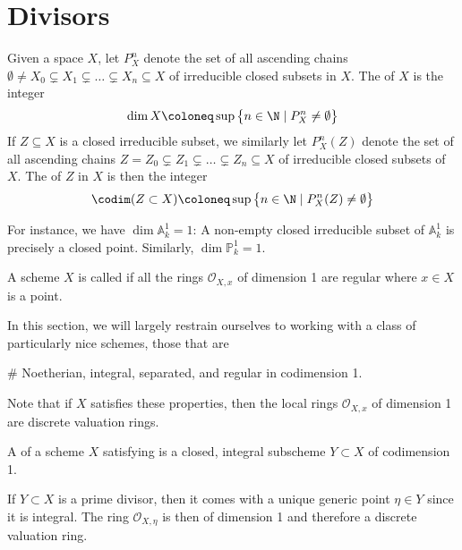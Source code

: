 \documentclass[wip, algebra]{bsteffan-lecturenotes}
\newcommand{\cO}{\mathcal{O}}
\newcommand{\A}{\mathbb{A}}
\renewcommand{\P}{\mathbb{P}}
\begin{document}
\section{Divisors}
\begin{definition}
	Given a space $X$, let $P_X^n$ denote the set of all ascending chains $\emptyset \neq X_0 \subsetneq X_1 \subsetneq \ldots \subsetneq X_n \subseteq X$ of irreducible closed subsets in $X$.  
	The  of $X$ is the integer
	\begin{equation*}
		\dim X \coloneq \sup \big\{n \in \N \mid P^n_X \neq \emptyset\big\}
	\end{equation*}
	If $Z \subseteq X$ is a closed irreducible subset, we similarly let $P_X^n(Z)$ denote the set of all ascending chains $Z = Z_0 \subsetneq Z_1 \subsetneq \ldots \subsetneq Z_n \subseteq X$ of irreducible closed subsets of $X$.
	The  of $Z$ in $X$ is then the integer
	\begin{equation*}
		\codim(Z \subset X) \coloneq \sup \big\{n \in \N \mid P^n_X(Z) \neq \emptyset\big\}
	\end{equation*}
\end{definition}
For instance, we have $\dim \A^1_k = 1$: A non-empty closed irreducible subset of $\A^1_k$ is precisely a closed point.
Similarly, $\dim \P^1_k = 1$.
\begin{definition}
	A scheme $X$ is called  if all the rings $\cO_{X, x}$ of dimension 1 are regular where $x \in X$ is a point.
\end{definition}
In this section, we will largely restrain ourselves to working with a class of particularly nice schemes, those that are\textellipsis{}
\begin{alphanumerate}
	\item[\#]\label{ass:divs:standard} Noetherian, integral, separated, and regular in codimension 1.
\end{alphanumerate}
Note that if $X$ satisfies these properties, then the local rings $\cO_{X, x}$ of dimension 1 are discrete valuation rings.
\begin{definition}
	A  of a scheme $X$ satisfying  is a closed, integral subscheme $Y \subset X$ of codimension 1.
\end{definition}
If $Y \subset X$ is a prime divisor, then it comes with a unique generic point $\eta \in Y$ since it is integral.
The ring $\cO_{X, \eta}$ is then of dimension 1 and therefore a discrete valuation ring.
\end{document}
